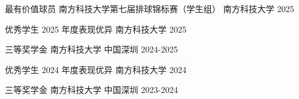 

\begin{cvhonors}

  \cvhonor
    {最有价值球员}
    {南方科技大学第七届排球锦标赛（学生组）}
    {南方科技大学}
    {2025}

  \cvhonor
    {优秀学生}
    {2025 年度表现优异}
    {南方科技大学}
    {2025}

  \cvhonor
    {三等奖学金}
    {南方科技大学}
    {中国深圳}
    {2024-2025}

  \cvhonor
    {优秀学生}
    {2024 年度表现优异}
    {南方科技大学}
    {2024}

  \cvhonor
    {三等奖学金}
    {南方科技大学}
    {中国深圳}
    {2023-2024}

\end{cvhonors}
